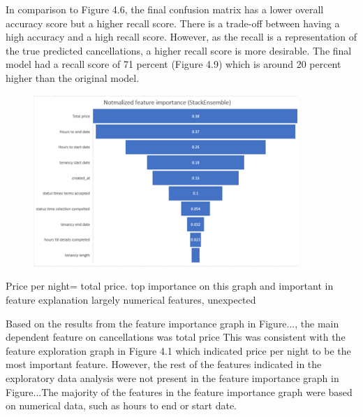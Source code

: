 In comparison to Figure 4.6, the final confusion matrix has a lower overall accuracy score but a higher recall score. There is a trade-off between having a high accuracy and a high recall score. However, as the recall is a representation of the true predicted cancellations, a higher recall score is more desirable. The final model had a recall score of 71 percent (Figure 4.9) which is around 20 percent higher than the original model. 

\begin{figure}[H]
 \includegraphics[width=10cm]{figures/feature_importance.png}
 \caption{}
\end{figure}

Price per night= total price. top importance on this graph and important in feature explanation
largely numerical features, unexpected

Based on the results from the feature importance graph in Figure..., the main dependent feature on cancellations was total price This was consistent with the feature exploration graph in Figure 4.1 which indicated price per night to be the most important feature. However, the rest of the features indicated in the exploratory data analysis were not present in the feature importance graph in Figure...The majority of the features in the feature importance graph were based on numerical data, such as hours to end or start date. 


